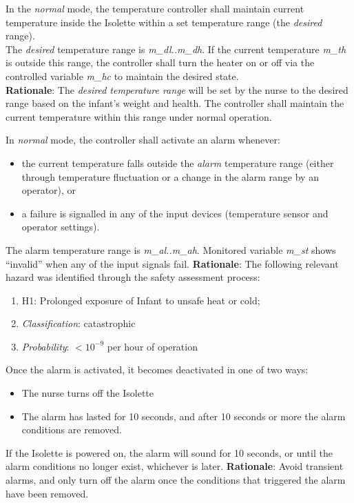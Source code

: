 \documentclass[fontsize=12pt,paper=letter,twoside]{scrartcl}
\begin{document}
{In the \emph{normal} mode, the temperature controller shall maintain current temperature inside the Isolette within a set temperature range (the \emph{desired} range).\\}
{The \emph{desired} temperature range is \emph{m\_dl..m\_dh}. If the current temperature \emph{m\_th} is outside this range, the controller shall turn the heater on or off via the controlled variable \emph{m\_hc} to maintain the desired state.\\}
\label{R2}
\textbf{Rationale}: The \emph{desired temperature range} will be set by the nurse to the desired range based on the infant's weight and health. The controller shall maintain the current temperature within this range under normal operation.

{In \emph{normal} mode, the controller shall activate an alarm whenever:
\begin{itemize}
    \item the current temperature falls outside the \emph{alarm} temperature range (either through temperature fluctuation or a change in the alarm range by an operator), or
    \item a failure is signalled in any of the input devices (temperature sensor and operator settings).\\
\end{itemize}}
{The alarm temperature range is \emph{m\_al..m\_ah}. Monitored variable \emph{m\_st} shows ``invalid'' when any of the input signals fail.}
\label{R3}
\textbf{Rationale}: The following relevant hazard was identified through the safety assessment process:
\begin{enumerate}
    \item H1: Prolonged exposure of Infant to unsafe heat or cold;
    \item \emph{Classification}: catastrophic
    \item \emph{Probability}: $<10^{-9}$ per hour of operation
\end{enumerate}

{Once the alarm is activated, it becomes deactivated in one of two ways:
\begin{itemize}
\item The nurse turns off the Isolette
\item The alarm has lasted for 10 seconds, and after 10 seconds or more the alarm conditions are removed. \\
\end{itemize}}
{If the Isolette is powered on, the alarm will sound for 10 seconds, or until the alarm conditions no longer exist, whichever is later.}
\label{R4}
\textbf{Rationale}: Avoid transient alarms, and only turn off the alarm once the conditions that triggered the alarm have been removed.
\end{document}
